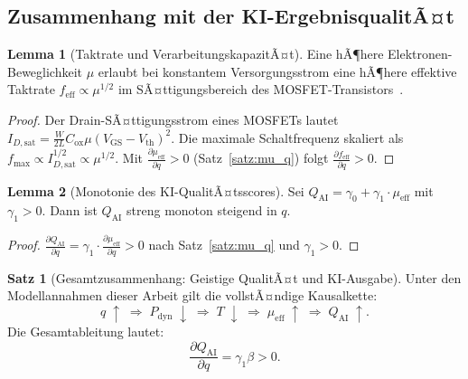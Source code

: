 ﻿\documentclass[a4paper,12pt]{article}
\theoremstyle{definition}
\newtheorem{satz}{Satz}
\newtheorem{lemma}{Lemma}
\begin{document}
\subsection{Zusammenhang mit der KI-ErgebnisqualitÃ¤t}

\begin{lemma}[Taktrate und VerarbeitungskapazitÃ¤t]
\label{lem:takt}
Eine hÃ¶here Elektronen-Beweglichkeit $\mu$ erlaubt bei konstantem Versorgungsstrom
eine hÃ¶here effektive Taktrate $f_{\mathrm{eff}} \propto \mu^{1/2}$ im SÃ¤ttigungsbereich
des MOSFET-Transistors~\cite{Lundstrom2009}.
\end{lemma}

\begin{proof}
Der Drain-SÃ¤ttigungsstrom eines MOSFETs lautet
$I_{D,\mathrm{sat}} = \tfrac{W}{2L} C_{\mathrm{ox}} \mu (V_{\mathrm{GS}} - V_{\mathrm{th}})^2$.
Die maximale Schaltfrequenz skaliert als $f_{\mathrm{max}} \propto I_{D,\mathrm{sat}}^{1/2} \propto \mu^{1/2}$.
Mit $\frac{\partial \mu_{\mathrm{eff}}}{\partial q} > 0$ (Satz~\ref{satz:mu_q}) folgt
$\frac{\partial f_{\mathrm{eff}}}{\partial q} > 0$. \qedhere
\end{proof}

\begin{lemma}[Monotonie des KI-QualitÃ¤tsscores]
\label{lem:quality}
Sei $Q_{\mathrm{AI}} = \gamma_0 + \gamma_1 \cdot \mu_{\mathrm{eff}}$ mit $\gamma_1 > 0$.
Dann ist $Q_{\mathrm{AI}}$ streng monoton steigend in $q$.
\end{lemma}

\begin{proof}
$\frac{\partial Q_{\mathrm{AI}}}{\partial q}
= \gamma_1 \cdot \frac{\partial \mu_{\mathrm{eff}}}{\partial q} > 0$
nach Satz~\ref{satz:mu_q} und $\gamma_1 > 0$. \qedhere
\end{proof}

\begin{satz}[Gesamtzusammenhang: Geistige QualitÃ¤t und KI-Ausgabe]
\label{satz:gesamt}
Unter den Modellannahmen dieser Arbeit gilt die vollstÃ¤ndige Kausalkette:
\[
q \;\uparrow \;\Longrightarrow\; P_{\mathrm{dyn}} \;\downarrow \;\Longrightarrow\; T \;\downarrow
\;\Longrightarrow\; \mu_{\mathrm{eff}} \;\uparrow \;\Longrightarrow\; Q_{\mathrm{AI}} \;\uparrow.
\]
Die Gesamtableitung lautet:
\[
\frac{\partial Q_{\mathrm{AI}}}{\partial q}
= \gamma_1 \beta > 0.
\]
\end{satz}
\end{document}
